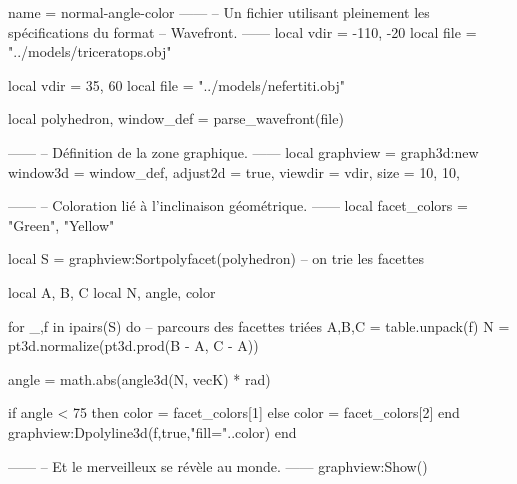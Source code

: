 \documentclass{standalone}
\begin{document}
\begin{luadraw}{name = normal-angle-color}
------
-- Un fichier utilisant pleinement les spécifications du format
-- Wavefront.
------
local vdir = {-110, -20}
local file = "../models/triceratops.obj"

local vdir = {35, 60}
local file = "../models/nefertiti.obj"

local polyhedron, window_def = parse_wavefront(file)

------
-- Définition de la zone graphique.
------
local graphview = graph3d:new{
  window3d = window_def,
  adjust2d = true,
  viewdir  = vdir,
  size     = {10, 10},
}

------
-- Coloration lié à l'inclinaison géométrique.
------
local facet_colors = {"Green", "Yellow"}

local S = graphview:Sortpolyfacet(polyhedron) -- on trie les facettes

local A, B, C
local N, angle, color

for _,f in ipairs(S) do  -- parcours des facettes triées
  A,B,C = table.unpack(f)
  N = pt3d.normalize(pt3d.prod(B - A, C - A))

  angle = math.abs(angle3d(N, vecK) * rad)


  if angle < 75 then
    color = facet_colors[1]
  else
    color = facet_colors[2]
  end
  graphview:Dpolyline3d(f,true,"fill="..color)
end

------
-- Et le merveilleux se révèle au monde.
------
graphview:Show()

\end{luadraw}
\end{document}
